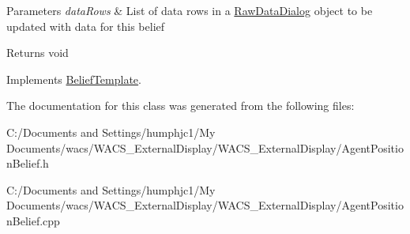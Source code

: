 \begin{DoxyParams}{Parameters}
{\em dataRows} & List of data rows in a \hyperlink{class_raw_data_dialog}{RawDataDialog} object to be updated with data for this belief \\
\hline
\end{DoxyParams}
\begin{DoxyReturn}{Returns}
void 
\end{DoxyReturn}


Implements \hyperlink{class_belief_template_a72e58b1d025012f3f2572a8983e8355c}{BeliefTemplate}.



The documentation for this class was generated from the following files:\begin{DoxyCompactItemize}
\item 
C:/Documents and Settings/humphjc1/My Documents/wacs/WACS\_\-ExternalDisplay/WACS\_\-ExternalDisplay/AgentPositionBelief.h\item 
C:/Documents and Settings/humphjc1/My Documents/wacs/WACS\_\-ExternalDisplay/WACS\_\-ExternalDisplay/AgentPositionBelief.cpp\end{DoxyCompactItemize}

